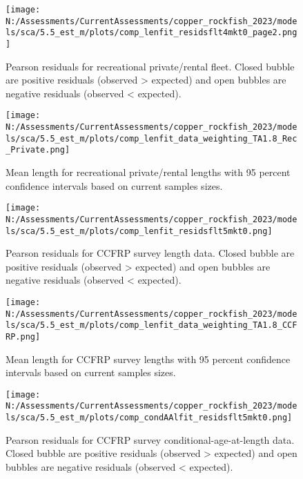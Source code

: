 \documentclass[11pt,
  english,
  letterpaper,
]{article}
\begin{document}
\begin{figure}
\centering
\texttt{[image: N:/Assessments/CurrentAssessments/copper\_rockfish\_2023/models/sca/5.5\_est\_m/plots/comp\_lenfit\_residsflt4mkt0\_page2.png]}
\caption{Pearson residuals for recreational private/rental fleet. Closed bubble are positive residuals (observed \textgreater{} expected) and open bubbles are negative residuals (observed \textless{} expected).\label{fig:rec-pr-pearson}}
\end{figure}

\begin{figure}
\centering
\texttt{[image: N:/Assessments/CurrentAssessments/copper\_rockfish\_2023/models/sca/5.5\_est\_m/plots/comp\_lenfit\_data\_weighting\_TA1.8\_Rec\_Private.png]}
\caption{Mean length for recreational private/rental lengths with 95 percent confidence intervals based on current samples sizes.\label{fig:rec-pr-mean-len-fit}}
\end{figure}

\begin{figure}
\centering
\texttt{[image: N:/Assessments/CurrentAssessments/copper\_rockfish\_2023/models/sca/5.5\_est\_m/plots/comp\_lenfit\_residsflt5mkt0.png]}
\caption{Pearson residuals for CCFRP survey length data. Closed bubble are positive residuals (observed \textgreater{} expected) and open bubbles are negative residuals (observed \textless{} expected).\label{fig:ccfrp-len-pearson}}
\end{figure}

\begin{figure}
\centering
\texttt{[image: N:/Assessments/CurrentAssessments/copper\_rockfish\_2023/models/sca/5.5\_est\_m/plots/comp\_lenfit\_data\_weighting\_TA1.8\_CCFRP.png]}
\caption{Mean length for CCFRP survey lengths with 95 percent confidence intervals based on current samples sizes.\label{fig:ccfrp-mean-len-fit}}
\end{figure}

\begin{figure}
\centering
\texttt{[image: N:/Assessments/CurrentAssessments/copper\_rockfish\_2023/models/sca/5.5\_est\_m/plots/comp\_condAAlfit\_residsflt5mkt0.png]}
\caption{Pearson residuals for CCFRP survey conditional-age-at-length data. Closed bubble are positive residuals (observed \textgreater{} expected) and open bubbles are negative residuals (observed \textless{} expected).\label{fig:ccfrp-age-pearson}}
\end{figure}
\end{document}
